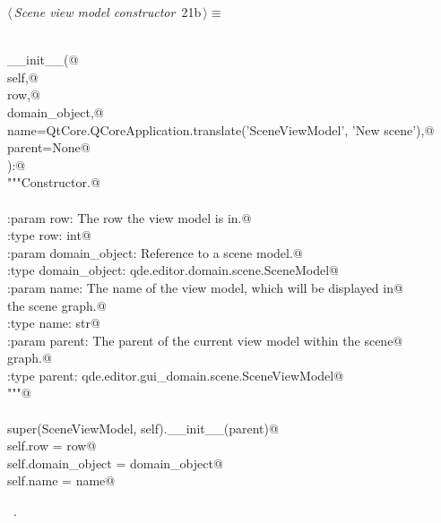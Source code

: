 \documentclass[
    a4paper,      %
    10pt,         %
    openright,    %
    notitlepage,  %
    parskip=half, %
]{scrreprt}       %
\theoremstyle{definition}                    %
\begin{document}
\begin{flushleft} \small
\begin{minipage}{\linewidth}\label{scrap13}\raggedright\small
{} $\langle\,${\itshape Scene view model constructor}\nobreak\ {\footnotesize {21b}}$\,\rangle\equiv$
\vspace{-1ex}
\begin{list}{}{} \item
\mbox{}\lstinline@@\\
\mbox{}\lstinline@def __init__(@\\
\mbox{}\lstinline@        self,@\\
\mbox{}\lstinline@        row,@\\
\mbox{}\lstinline@        domain_object,@\\
\mbox{}\lstinline@        name=QtCore.QCoreApplication.translate('SceneViewModel', 'New scene'),@\\
\mbox{}\lstinline@        parent=None@\\
\mbox{}\lstinline@):@\\
\mbox{}\lstinline@    """Constructor.@\\
\mbox{}\lstinline@@\\
\mbox{}\lstinline@    :param row:           The row the view model is in.@\\
\mbox{}\lstinline@    :type  row:           int@\\
\mbox{}\lstinline@    :param domain_object: Reference to a scene model.@\\
\mbox{}\lstinline@    :type  domain_object: qde.editor.domain.scene.SceneModel@\\
\mbox{}\lstinline@    :param name:          The name of the view model, which will be displayed in@\\
\mbox{}\lstinline@                          the scene graph.@\\
\mbox{}\lstinline@    :type  name:          str@\\
\mbox{}\lstinline@    :param parent:        The parent of the current view model within the scene@\\
\mbox{}\lstinline@                          graph.@\\
\mbox{}\lstinline@    :type parent:         qde.editor.gui_domain.scene.SceneViewModel@\\
\mbox{}\lstinline@    """@\\
\mbox{}\lstinline@@\\
\mbox{}\lstinline@    super(SceneViewModel, self).__init__(parent)@\\
\mbox{}\lstinline@    self.row  = row@\\
\mbox{}\lstinline@    self.domain_object = domain_object@\\
\mbox{}\lstinline@    self.name = name@\\
\mbox{}\lstinline@@{\NWsep}
\end{list}
\vspace{-1.5ex}
\footnotesize
\begin{list}{}{\setlength{\itemsep}{-\parsep}\setlength{\itemindent}{-\leftmargin}}
\item \NWtxtMacroRefIn\ .


\end{list}
\end{minipage}
\end{flushleft}
\end{document}
